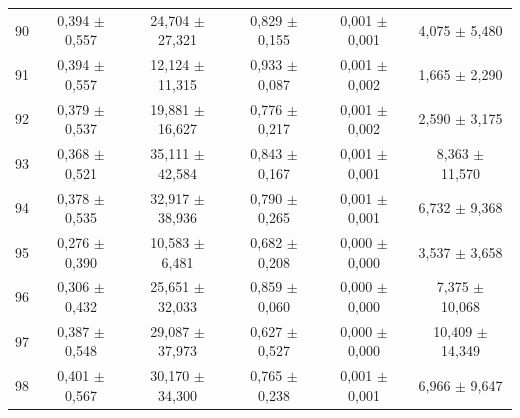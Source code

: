 \begin{tabular}{l c c c c c}
90 & 0,394 $\pm$ 0,557 & 24,704 $\pm$ 27,321 & 0,829 $\pm$ 0,155 & 0,001 $\pm$ 0,001 & 4,075 $\pm$ 5,480 \\
91 & 0,394 $\pm$ 0,557 & 12,124 $\pm$ 11,315 & 0,933 $\pm$ 0,087 & 0,001 $\pm$ 0,002 & 1,665 $\pm$ 2,290 \\
92 & 0,379 $\pm$ 0,537 & 19,881 $\pm$ 16,627 & 0,776 $\pm$ 0,217 & 0,001 $\pm$ 0,002 & 2,590 $\pm$ 3,175 \\
93 & 0,368 $\pm$ 0,521 & 35,111 $\pm$ 42,584 & 0,843 $\pm$ 0,167 & 0,001 $\pm$ 0,001 & 8,363 $\pm$ 11,570 \\
94 & 0,378 $\pm$ 0,535 & 32,917 $\pm$ 38,936 & 0,790 $\pm$ 0,265 & 0,001 $\pm$ 0,001 & 6,732 $\pm$ 9,368 \\
95 & 0,276 $\pm$ 0,390 & 10,583 $\pm$ 6,481 & 0,682 $\pm$ 0,208 & 0,000 $\pm$ 0,000 & 3,537 $\pm$ 3,658 \\
96 & 0,306 $\pm$ 0,432 & 25,651 $\pm$ 32,033 & 0,859 $\pm$ 0,060 & 0,000 $\pm$ 0,000 & 7,375 $\pm$ 10,068 \\
97 & 0,387 $\pm$ 0,548 & 29,087 $\pm$ 37,973 & 0,627 $\pm$ 0,527 & 0,000 $\pm$ 0,000 & 10,409 $\pm$ 14,349 \\
98 & 0,401 $\pm$ 0,567 & 30,170 $\pm$ 34,300 & 0,765 $\pm$ 0,238 & 0,001 $\pm$ 0,001 & 6,966 $\pm$ 9,647 \\
\hline 
 \end{tabular}
